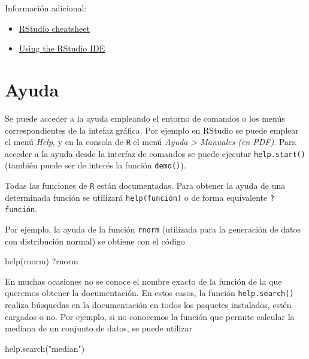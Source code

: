 \documentclass[
]{book}
\newenvironment{Shaded}{\begin{snugshade}}{\end{snugshade}}
\newcommand{\FunctionTok}[1]{\textcolor[rgb]{0.00,0.00,0.00}{#1}}
\newcommand{\NormalTok}[1]{#1}
\newcommand{\StringTok}[1]{\textcolor[rgb]{0.31,0.60,0.02}{#1}}
\theoremstyle{break}
\theoremstyle{nonumberplain}
\begin{document}
Información adicional:

\begin{itemize}
\item
  \href{https://posit.co/wp-content/uploads/2022/10/rstudio-ide-1.pdf}{RStudio cheatsheet}
\item
  \href{https://support.posit.co/hc/en-us/sections/200107586-Using-the-RStudio-IDE}{Using the RStudio IDE}
\end{itemize}

\hypertarget{ayuda}{%
\section{Ayuda}\label{ayuda}}

Se puede acceder a la ayuda empleando el entorno de comandos o los menús correspondientes de la intefaz gráfica.
Por ejemplo en RStudio se puede emplear el menú \emph{Help}, y en la consola de \texttt{R} el menú \emph{Ayuda \textgreater{} Manuales (en PDF)}.
Para acceder a la ayuda desde la interfaz de comandos se puede ejecutar \texttt{help.start()} (también puede ser de interés la función \texttt{demo()}).

Todas las funciones de \texttt{R} están documentadas.
Para obtener la ayuda de una determinada función se utilizará \texttt{help(función)} o de forma equivalente \texttt{?función}.

Por ejemplo, la ayuda de la función \texttt{rnorm} (utilizada para la generación de datos con distribución normal) se obtiene con el código

\begin{Shaded}
\begin{Highlighting}[]
\FunctionTok{help}\NormalTok{(rnorm)}
\NormalTok{?rnorm}
\end{Highlighting}
\end{Shaded}

En muchas ocasiones no se conoce el nombre exacto de la función de la que queremos obtener la documentación.
En estos casos, la función \texttt{help.search()} realiza búsquedas en la documentación en todos los paquetes instalados, estén cargados o no.
Por ejemplo, si no conocemos la función que permite calcular la mediana de un conjunto de datos, se puede utilizar

\begin{Shaded}
\begin{Highlighting}[]
\FunctionTok{help.search}\NormalTok{(}\StringTok{"median"}\NormalTok{)}
\end{Highlighting}
\end{Shaded}
\end{document}
